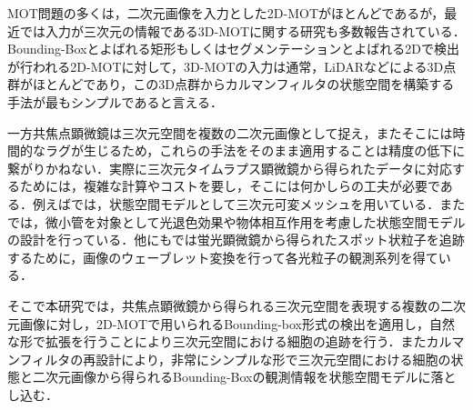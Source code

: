 MOT問題の多くは，二次元画像を入力とした2D-MOTがほとんどであるが，最近では入力が三次元の情報である3D-MOTに関する研究も多数報告されている．Bounding-Boxとよばれる矩形もしくはセグメンテーションとよばれる2Dで検出が行われる2D-MOTに対して，3D-MOTの入力は通常，LiDARなどによる3D点群がほとんどであり，この3D点群からカルマンフィルタの状態空間を構築する手法が最もシンプルであると言える．

一方共焦点顕微鏡は三次元空間を複数の二次元画像として捉え，またそこには時間的なラグが生じるため，これらの手法をそのまま適用することは精度の低下に繋がりかねない．実際に三次元タイムラプス顕微鏡から得られたデータに対応するためには，複雑な計算やコストを要し，そこには何かしらの工夫が必要である．例えば\cite{5676210}では，状態空間モデルとして三次元可変メッシュを用いている．また\cite{smal2008particle}では，微小管を対象として光退色効果や物体相互作用を考慮した状態空間モデルの設計を行っている．他にも\cite{1621229}では蛍光顕微鏡から得られたスポット状粒子を追跡するために，画像のウェーブレット変換を行って各光粒子の観測系列を得ている．

そこで本研究では，共焦点顕微鏡から得られる三次元空間を表現する複数の二次元画像に対し，2D-MOTで用いられるBounding-box形式の検出を適用し，自然な形で拡張を行うことにより三次元空間における細胞の追跡を行う．またカルマンフィルタの再設計により，非常にシンプルな形で三次元空間における細胞の状態と二次元画像から得られるBounding-Boxの観測情報を状態空間モデルに落とし込む．